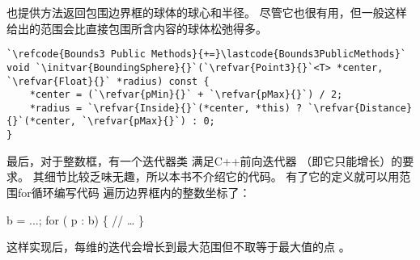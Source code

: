 也提供方法返回包围边界框的球体的球心和半径。
尽管它也很有用，但一般这样给出的范围会比直接包围所含内容的球体松弛得多。
\begin{lstlisting}
`\refcode{Bounds3 Public Methods}{+=}\lastcode{Bounds3PublicMethods}`
void `\initvar{BoundingSphere}{}`(`\refvar{Point3}{}`<T> *center, `\refvar{Float}{}` *radius) const {
    *center = (`\refvar{pMin}{}` + `\refvar{pMax}{}`) / 2;
    *radius = `\refvar{Inside}{}`(*center, *this) ? `\refvar{Distance}{}`(*center, `\refvar{pMax}{}`) : 0;
}
\end{lstlisting}

最后，对于整数框，有一个迭代器类
满足C++前向迭代器
（即它只能增长）的要求。
其细节比较乏味无趣，所以本书不介绍它的代码。
有了它的定义就可以用范围{\ttfamily for}循环编写代码
遍历边界框内的整数坐标了：

{\ttfamily\indent {} b = ...;}\newline
{\ttfamily\indent for ( p : b) \{}\newline
{\ttfamily\indent \qquad//  …}\newline
{\ttfamily\indent \}}

这样实现后，每维的迭代会增长到最大范围但不取等于最大值的点
。
